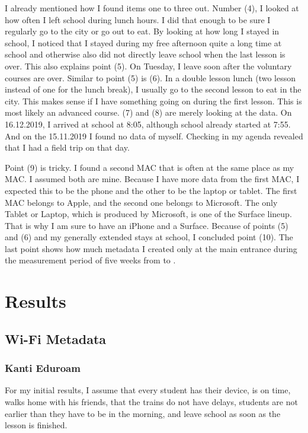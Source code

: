 \documentclass[paper=a4, fontsize=11pt]{article}
\begin{document}
I already mentioned how I found items one to three out. Number (4), I looked at how often I left school during lunch hours. I did that enough to be sure I regularly go to the city or go out to eat.
By looking at how long I stayed in school, I noticed that I stayed during my free afternoon quite a long time at school and otherwise also did not directly leave school when the last lesson is over.
This also explains point (5). On Tuesday, I leave soon after the voluntary courses are over.
Similar to point (5) is (6). In a double lesson lunch (two lesson instead of one for the lunch break), I usually go to the second lesson to eat in the city. This makes sense if I have something going on during the first lesson. This is most likely an advanced course.
(7) and (8) are merely looking at the data. On 16.12.2019, I arrived at school at 8:05, although school already started at 7:55. And on the 15.11.2019 I found no data of myself. Checking in my agenda revealed that I had a field trip on that day.

Point (9) is tricky. I found a second MAC that is often at the same place as my MAC. I assumed both are mine. Because I have more data from the first MAC, I expected this to be the phone and the other to be the laptop or tablet. The first MAC belongs to Apple, and the second one belongs to Microsoft. The only Tablet or Laptop, which is produced by Microsoft, is one of the Surface lineup. That is why I am sure to have an iPhone and a Surface.
Because of points (5) and (6) and my generally extended stays at school, I concluded point (10).
The last point shows how much metadata I created only at the main entrance during the measurement period of five weeks from  to . 

\section{Results}

\subsection{ Wi-Fi Metadata}
\subsubsection{Kanti Eduroam}
For my initial results, I assume that every student has their device, is on time, walks home with his friends, that the trains do not have delays, students are not earlier than they have to be in the morning, and leave school as soon as the lesson is finished.
\end{document}
